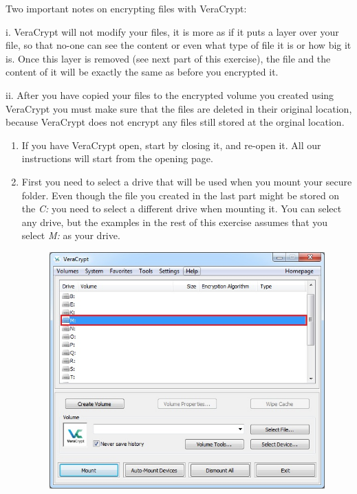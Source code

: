 \documentclass{tufte-handout}
\begin{document}
	Two important notes on encrypting files with VeraCrypt:
	
	i. VeraCrypt will not modify your files, it is more as if it puts a layer over your file, so that no-one can see the content or even what type of file it is or how big it is. Once this layer is removed (see next part of this exercise), the file and the content of it will be exactly the same as before you encrypted it.
	
	ii. After you have copied your files to the encrypted volume you created using VeraCrypt you must make sure that the files are deleted in their original location, because VeraCrypt does not encrypt any files still stored at the orginal location.
	

\begin{enumerate}
	\item If you have VeraCrypt open, start by closing it, and re-open it. All our instructions will start from the opening page.
	
	\item First you need to select a drive that will be used when you mount your secure folder. Even though the file you created in the last part might be stored on the \textit{C:} you need to select a different drive when mounting it. You can select any drive, but the examples in the rest of this exercise assumes that you select \textit{M:} as your drive.
	\begin{figure}%
		\includegraphics[width=.8\linewidth]{img/vc_mount_1.png}
	\end{figure}
	\FloatBarrier
	

\end{enumerate}
\end{document}
